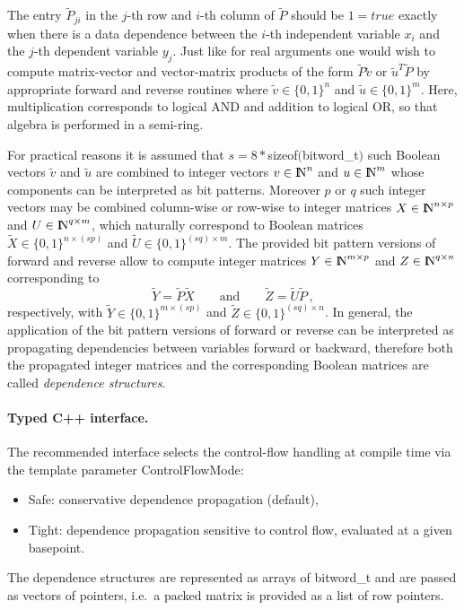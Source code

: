 \documentclass[11pt,twoside]{article}
\newcommand{\N}{{ {\rm I} \kern -.225em {\rm N} }}
\begin{document}
The entry $\tilde{P}_{ji}$ in the $j$-th row and $i$-th column
of $\tilde{P}$ should be $1 = true$ exactly when there is a data
dependence between the $i$-th independent variable $x_{i}$ and
the $j$-th dependent variable $y_{j}$. Just like for real arguments
one would wish to compute matrix-vector and vector-matrix products
of the form $\tilde{P}\tilde{v}$ or $\tilde{u}^{T}\tilde{P}$
by appropriate {\sf forward} and {\sf reverse} routines where
$\tilde{v}\in\{0,1\}^{n}$ and $\tilde{u}\in\{0,1\}^{m}$.
Here, multiplication corresponds to logical
{\sf AND} and addition to logical {\sf OR}, so that algebra is performed in a
semi-ring.

For practical reasons it is assumed that
$s=8*${\sf sizeof}$(${\sf bitword\_t}$)$ such Boolean vectors
$\tilde{v}$ and $\tilde{u}$ are combined to integer vectors
$v\in\N^{n}$ and $u\in\N^{m}$ whose components can be interpreted
as bit patterns. Moreover $p$ or $q$ such integer vectors may
be combined column-wise or row-wise to integer matrices $X\in\N^{n \times p}$
and $U\in\N^{q \times m}$, which naturally correspond
to Boolean matrices $\tilde{X}\in\{0,1\}^{n\times\left(sp\right)}$
and $\tilde{U}\in\{0,1\}^{\left(sq\right)\times m}$. The provided
bit pattern versions of {\sf forward} and {\sf reverse} allow
to compute integer matrices $Y\in\N^{m \times p}$ and
$Z\in\N^{q \times n}$ corresponding to
\begin{equation}
\label{eq:int_forrev}
\tilde{Y} = \tilde{P}\tilde{X} \qquad \mbox{and} \qquad
\tilde{Z} = \tilde{U}\tilde{P} \, ,
\end{equation}
respectively, with $\tilde{Y}\in\{0,1\}^{m\times\left(sp\right)}$
and $\tilde{Z}\in\{0,1\}^{\left(sq\right)\times n}$.
In general, the application of the bit pattern versions of
{\sf forward} or {\sf reverse} can be interpreted as
propagating dependencies between variables forward or backward, therefore
both the propagated integer matrices and the corresponding
Boolean matrices are called {\em dependence structures}.

\paragraph{Typed C++ interface.}
The recommended interface selects the control-flow handling at compile time
via the template parameter {\sf ControlFlowMode}:
\begin{itemize}
  \item {\sf Safe}: conservative dependence propagation (default),
  \item {\sf Tight}: dependence propagation sensitive to control flow, evaluated
        at a given basepoint.
\end{itemize}
The dependence structures are represented as arrays of {\sf bitword\_t}
and are passed as vectors of pointers, i.e.\ a packed matrix is provided
as a list of row pointers.
\end{document}
